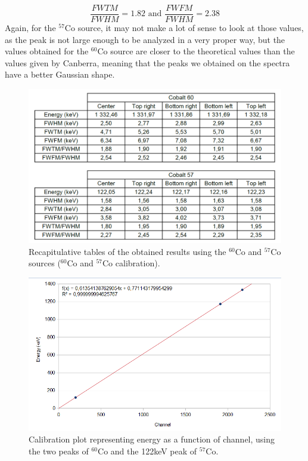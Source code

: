 \documentclass[11pt,a4paper]{article}
\begin{document}
\begin{equation}
\dfrac{FWTM}{FWHM} = 1.82 \text{ and } \dfrac{FWFM}{FWHM} = 2.38
\end{equation}
Again, for the $^{57}$Co source, it may not make a lot of sense to look at those values, as the peak is not large enough to be analyzed in a very proper way, but the values obtained for the $^{60}$Co source are closer to the theoretical values than the values given by Canberra, meaning that the peaks we obtained on the spectra have a better Gaussian shape.

\begin{figure}[!h]
\centering
\includegraphics[scale=0.7]{Scan_Cos_2.png}
\caption{Recapitulative tables of the obtained results using the $^{60}$Co and $^{57}$Co sources ($^{60}$Co and $^{57}$Co calibration).}
\label{recap2}
\end{figure}

\begin{figure}[!ht]
\centering
\includegraphics[scale=0.9]{Calibration_2.png}
\caption{Calibration plot representing energy as a function of channel, using the two peaks of $^{60}$Co and the 122keV peak of $^{57}$Co.}
\label{calib2}
\end{figure}
\end{document}
